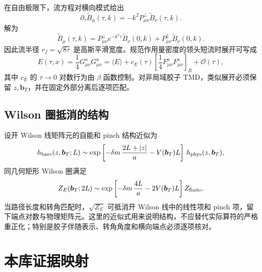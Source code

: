 \documentclass[UTF8,12pt,a4paper,twoside,openany]{ctexbook}
\newcommand{\bT}{\boldsymbol b_T}
\begin{document}
在自由极限下，流方程对横向模式给出
\begin{equation}
  \partial_\tau\widetilde B_\mu(\tau,k)
  =-k^2P^\perp_{\mu\nu}\widetilde B_\nu(\tau,k).
  \label{eq:heatflow}
\end{equation}
解为
\begin{equation}
  \widetilde B_\mu(\tau,k)
  =P^\perp_{\mu\nu}e^{-k^2\tau}\widetilde B_\nu(0,k)
  +P^\parallel_{\mu\nu}\widetilde B_\nu(0,k).
  \label{eq:heatflowsolution}
\end{equation}
因此流半径 \(r_f=\sqrt{8\tau}\) 是高斯平滑宽度。规范作用量密度的领头短流时展开可写成
\begin{equation}
  E(\tau,x)
  =\frac14G^a_{\mu\nu}G^a_{\mu\nu}
  =\langle E\rangle
  +c_E(\tau)\left[\frac14F^a_{\mu\nu}F^a_{\mu\nu}\right]_R
  +\mathcal O(\tau),
  \label{eq:energyflow}
\end{equation}
其中 \(c_E\) 的 \(\tau\to0\) 对数行为由 \(\beta\) 函数控制。对非局域胶子 TMD，类似展开必须保留 \(z,\bT\)，并在固定外部分离后逐项匹配。

\section{Wilson 圈抵消的结构}

设开 Wilson 线矩阵元的自能和 pinch 结构近似为
\begin{equation}
  h_{\rm bare}(z,\bT;L)
  \sim
  \exp\left[-\delta m\,\frac{2L+|z|}{a}
  -V(\bT)L\right]\,
  h_{\rm phys}(z,\bT),
  \label{eq:barewilson}
\end{equation}
同几何矩形 Wilson 圈满足
\begin{equation}
  Z_E(\bT;2L)
  \sim
  \exp\left[-\delta m\,\frac{4L}{a}-2V(\bT)L\right]
  Z_{\rm finite}.
  \label{eq:zwilson}
\end{equation}
当路径长度和转角匹配时，\(\sqrt{Z_E}\) 可抵消开 Wilson 线中的线性项和 pinch 项，留下端点对数与物理矩阵元。这里的近似式用来说明结构，不应替代实际算符的严格重正化；特别是胶子伴随表示、转角角度和横向端点必须逐项核对。

\clearpage
\chapter{本库证据映射}
\end{document}
